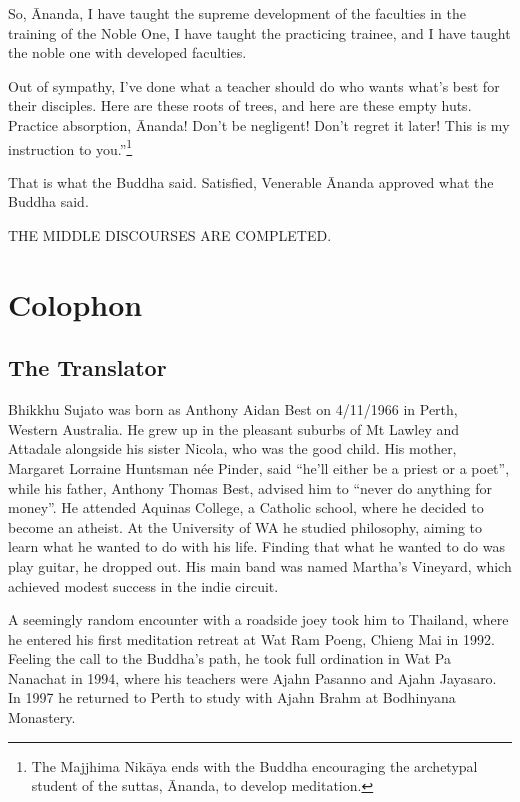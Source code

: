 \documentclass[12pt,openany]{book}%
\newcommand*{\scendbook}[1]{\bigskip\begin{Center}\uppercase{#1}\end{Center}\addvspace{1em}}
\let\oldbackmatter\backmatter
\renewcommand{\backmatter}{%
\chapterfont{\setstretch{.85}\normalfont\centering}%
\sectionfont{\setstretch{.85}\normalfont\BalancedRagged}%
\pagestyle{plainer}%
\oldbackmatter}
\begin{document}
So, Ānanda, I have taught the supreme development of the faculties in the training of the Noble One, I have taught the practicing trainee, and I have taught the noble one with developed faculties. 

Out of sympathy, I’ve done what a teacher should do who wants what’s best for their disciples. Here are these roots of trees, and here are these empty huts. Practice absorption, Ānanda! Don’t be negligent! Don’t regret it later! This is my instruction to you.”\footnote{The Majjhima \textsanskrit{Nikāya} ends with the Buddha encouraging the archetypal student of the suttas, Ānanda, to develop meditation. } 

That is what the Buddha said. Satisfied, Venerable Ānanda approved what the Buddha said. 

\scendbook{The Middle Discourses are completed. }

%
\backmatter%
\chapter*{Colophon}

\section*{The Translator}

Bhikkhu Sujato was born as Anthony Aidan Best on 4/11/1966 in Perth, Western Australia. He grew up in the pleasant suburbs of Mt Lawley and Attadale alongside his sister Nicola, who was the good child. His mother, Margaret Lorraine Huntsman née Pinder, said “he’ll either be a priest or a poet”, while his father, Anthony Thomas Best, advised him to “never do anything for money”. He attended Aquinas College, a Catholic school, where he decided to become an atheist. At the University of WA he studied philosophy, aiming to learn what he wanted to do with his life. Finding that what he wanted to do was play guitar, he dropped out. His main band was named Martha’s Vineyard, which achieved modest success in the indie circuit. 

A seemingly random encounter with a roadside joey took him to Thailand, where he entered his first meditation retreat at Wat Ram Poeng, Chieng Mai in 1992. Feeling the call to the Buddha’s path, he took full ordination in Wat Pa Nanachat in 1994, where his teachers were Ajahn Pasanno and Ajahn Jayasaro. In 1997 he returned to Perth to study with Ajahn Brahm at Bodhinyana Monastery. 
\end{document}
